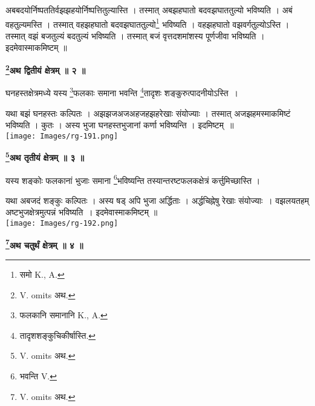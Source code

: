 \documentclass[11pt, openany]{book}
\begin{document}
\noindent 
अबबदयोर्निष्पततिर्वझझहयोर्निष्पत्तितुल्यास्ति । तस्मात् अबझहघातो बदवझघाततुल्यो भविष्यति । अबं वहतुल्यमस्ति । तस्मात् वहझहघातो बदवझघाततुल्यो\renewcommand{\thefootnote}{४}\footnote{समो {\en K., A.}} भविष्यति । वहझहघातो वझवर्गतुल्योऽस्ति । तस्मात् वझं बजतुल्यं बदतुल्यं भविष्यति । तस्मात् बजं वृत्तदशमांशस्य पूर्णजीवा भविष्यति । इदमेवास्माकमिष्टम् ॥\\
\begin{center}
\textbf{\large \renewcommand{\thefootnote}{५}\footnote{{\en V. omits} अथ.}अथ द्वितीयं क्षेत्रम् ॥ २ ॥ }
\end{center}
\vspace{5mm}

{\ab घनहस्तक्षेत्रमध्ये यस्य \renewcommand{\thefootnote}{६}\footnote{फलकानि समानानि {\en K., A.}}फलकाः समाना भवन्ति \renewcommand{\thefootnote}{७}\footnote{तादृशशङ्कुचिकीर्षास्ति.}तादृशः 
शङ्कुरुत्पादनीयोऽस्ति~। }


\newpage
\begin{vwcol}[widths={0.6,0.4}, sep=.8cm, rule=0pt]
यथा बझं घनहस्तः कल्पितः । अझझजअजअहजहझहरेखाः संयोज्याः ।
तस्मात् अजझहमस्माकमिष्टं भविष्यति । कुतः । अस्य भुजा घनहस्तभुजानां कर्णा
भविष्यन्ति । इदमिष्टम्~॥\\
\noindent \texttt{[image: Images/rg-191.png]}  
\end{vwcol}
\vspace{5mm}

\begin{center}
\textbf{\large \renewcommand{\thefootnote}{१}\footnote{{\en V. omits} अथ.}अथ तृतीयं क्षेत्रम् ॥ ३ ॥ }
\end{center}
\vspace{2mm}

{\ab यस्य शङ्कोः फलकानां भुजाः समाना \renewcommand{\thefootnote}{२}\footnote{भवन्ति {\en V.}}भविष्यन्ति तस्यान्तरष्टफलकक्षेत्रं कर्त्तुमिच्छास्ति ।} \\
\vspace{3mm}

\begin{vwcol}[widths={0.7,0.3}, sep=.8cm, rule=0pt]
यथा अबजदं शङ्कुः कल्पितः । अस्य षड् अपि भुजा अर्द्धिताः । अर्द्धचिह्नेषु रेखाः
संयोज्याः~। वझलयतहम् अष्टभुजक्षेत्रमुत्पन्नं भविष्यति~। इदमेवास्माकमिष्टम् ॥\\
\noindent \texttt{[image: Images/rg-192.png]}  
\end{vwcol}
\vspace{5mm}

\begin{center}
\textbf{\large \renewcommand{\thefootnote}{३}\footnote{{\en V. omits} अथ.}अथ चतुर्थं क्षेत्रम् ॥ ४ ॥ }\\
\end{center}
\vspace{7mm}
\end{document}
